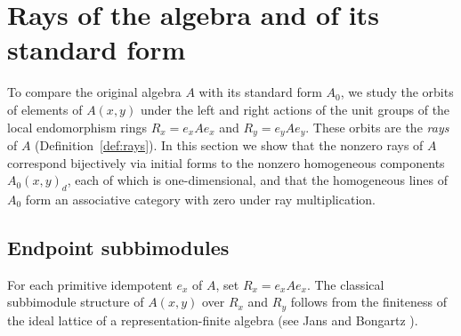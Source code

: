 \section{Rays of the algebra and of its standard form}
\label{sec:projective-rays}

To compare the original algebra $A$ with its standard form $A_0$, we study
the orbits of elements of $A(x,y)$ under the left and right actions of the
unit groups of the local endomorphism rings $R_x=e_xAe_x$ and $R_y=e_yAe_y$.
These orbits are the \emph{rays} of $A$ (Definition~\ref{def:rays}). In this
section we show that the nonzero rays of $A$ correspond bijectively via
initial forms to the nonzero homogeneous components $A_0(x,y)_d$, each of
which is one-dimensional, and that the homogeneous lines of $A_0$ form an
associative category with zero under ray multiplication.

\subsection{Endpoint subbimodules}

For each primitive idempotent $e_x$ of $A$, set $R_x=e_xAe_x$. The classical
subbimodule structure of $A(x,y)$ over $R_x$ and $R_y$ follows from the
finiteness of the ideal lattice of a representation-finite algebra (see Jans
\cite[Corollary~1.3 and Theorem~2.1]{Jans} and Bongartz
\cite[Section~2.3]{BongartzSurvey}).

